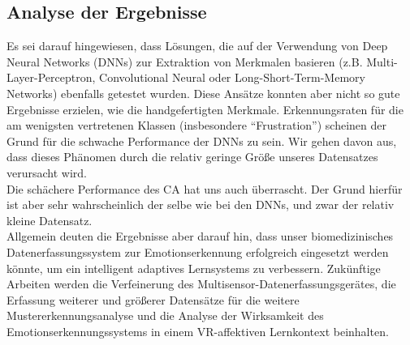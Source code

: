 \subsection{Analyse der Ergebnisse} \label{analyse-subsec}


Es sei darauf hingewiesen, dass Lösungen, die auf der Verwendung von Deep Neural Networks (DNNs) zur Extraktion von Merkmalen basieren (z.B. Multi-Layer-Perceptron, Convolutional Neural oder Long-Short-Term-Memory Networks) ebenfalls getestet wurden. Diese Ansätze konnten aber nicht so gute Ergebnisse erzielen, wie die handgefertigten Merkmale. Erkennungsraten für die am wenigsten vertretenen Klassen (insbesondere ``Frustration'') scheinen der Grund für die schwache Performance der DNNs zu sein. Wir gehen davon aus, dass dieses Phänomen durch die relativ geringe Größe unseres Datensatzes verursacht wird. \\

Die schächere Performance des CA hat uns auch überrascht. Der Grund hierfür ist aber sehr wahrscheinlich der selbe wie bei den  DNNs, und zwar der relativ kleine Datensatz. \\

Allgemein deuten die Ergebnisse aber darauf hin, dass unser biomedizinisches Datenerfassungssystem zur Emotionserkennung erfolgreich eingesetzt werden könnte, um ein intelligent adaptives Lernsystems zu verbessern. Zukünftige Arbeiten werden die Verfeinerung des Multisensor-Datenerfassungsgerätes, die Erfassung weiterer und größerer Datensätze für die weitere Mustererkennungsanalyse und die Analyse der Wirksamkeit des Emotionserkennungssystems in einem VR-affektiven Lernkontext beinhalten.